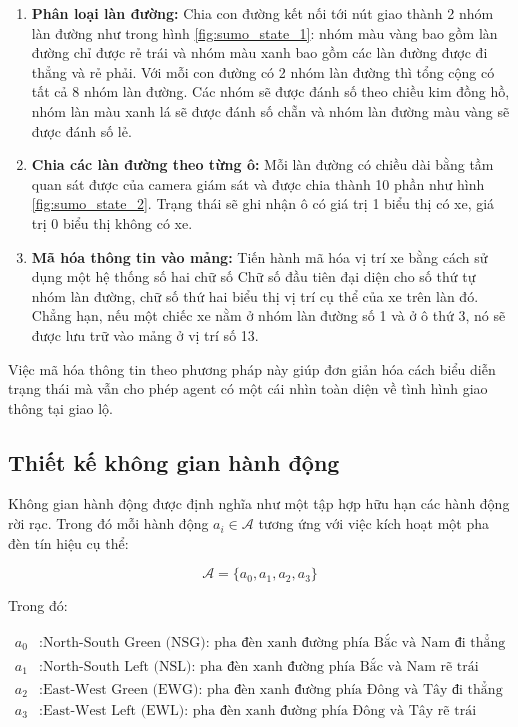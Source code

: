\begin{enumerate}
    \item \textbf{Phân loại làn đường:} Chia con đường kết nối tới nút giao thành 2 nhóm làn đường như trong hình \ref{fig:sumo_state_1}: nhóm màu vàng bao gồm làn đường chỉ được rẻ trái và nhóm màu xanh bao gồm các làn đường được đi thẳng và rẻ phải. Với mỗi con đường có 2 nhóm làn đường thì tổng cộng có tất cả 8 nhóm làn đường. Các nhóm sẽ được đánh số theo chiều kim đồng hồ, nhóm làn màu xanh lá sẽ được đánh số chẵn và nhóm làn đường màu vàng sẽ được đánh số lẻ.
    \item \textbf{Chia các làn đường theo từng ô:} Mỗi làn đường có chiều dài bằng tầm quan sát được của camera giám sát và được chia thành 10 phần như hình \ref{fig:sumo_state_2}. Trạng thái sẽ ghi nhận ô có giá trị 1 biểu thị có xe, giá trị 0 biểu thị không có xe.
    \item \textbf{Mã hóa thông tin vào mảng:} Tiến hành mã hóa vị trí xe bằng cách sử dụng một hệ thống số hai chữ số Chữ số đầu tiên đại diện cho số thứ tự nhóm làn đường, chữ số thứ hai biểu thị vị trí cụ thể của xe trên làn đó. Chẳng hạn, nếu một chiếc xe nằm ở nhóm làn đường số 1 và ở ô thứ 3, nó sẽ được lưu trữ vào mảng ở vị trí số 13.
\end{enumerate}
Việc mã hóa thông tin theo phương pháp này giúp đơn giản hóa cách biểu diễn trạng thái mà vẫn cho phép agent có một cái nhìn toàn diện về tình hình giao thông tại giao lộ.

\subsection{Thiết kế không gian hành động}
Không gian hành động được định nghĩa như một tập hợp hữu hạn các hành động rời rạc. Trong đó mỗi hành động $a_i \in \mathcal{A}$ tương ứng với việc kích hoạt một pha đèn tín hiệu cụ thể:

\[
    \mathcal{A} = \{a_0, a_1, a_2, a_3\}
\]

Trong đó:

\begin{align}
    a_0 &: \text{North-South Green (NSG): pha đèn xanh đường phía Bắc và Nam đi thẳng} \\
    a_1 &: \text{North-South Left (NSL): pha đèn xanh đường phía Bắc và Nam rẽ trái} \\
    a_2 &: \text{East-West Green (EWG): pha đèn xanh đường phía Đông và Tây đi thẳng} \\
    a_3 &: \text{East-West Left (EWL): pha đèn xanh đường phía Đông và Tây rẽ trái}
\end{align}


